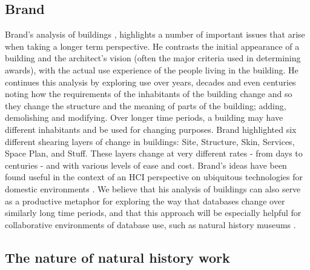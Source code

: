 \subsection{Brand}

Brand’s analysis of buildings \cite{brand1995buildings}, highlights a number of important issues that arise when taking a longer term perspective. He contrasts the initial appearance of a building and the architect’s vision (often the major criteria used in determining awards), with the actual use experience of the people living in the building. He continues this analysis by exploring use over years, decades and even centuries noting how the requirements of the inhabitants of the building change and so they change the structure and the meaning of parts of the building; adding, demolishing and modifying. Over longer time periods, a building may have different inhabitants and be used for changing purposes. Brand highlighted six different shearing layers of change in buildings: Site, Structure, Skin, Services, Space Plan, and Stuff. These layers change at very different rates - from days to centuries - and with various levels of ease and cost. Brand’s ideas have been found useful in the context of an HCI perspective on ubiquitous technologies for domestic environments \cite{rodden2003evolution}. We believe that his analysis of buildings can also serve as a productive metaphor for exploring the way that databases change over similarly long time periods, and that this approach will be especially helpful for collaborative environments of database use, such as natural history museums  \cite{thomer2014databases}. 

\subsection{The nature of natural history work}

